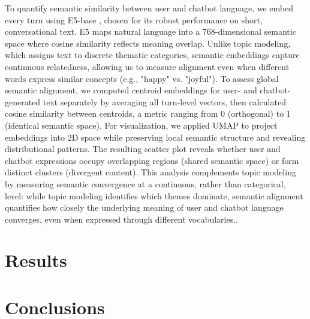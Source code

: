 \documentclass{article}
\begin{document}
To quantify semantic similarity between user and chatbot language, we embed every turn using E5-base \cite{Wang2022TextEB}, chosen for its robust performance on short, conversational text. E5 maps natural language into a 768-dimensional semantic space where cosine similarity reflects meaning overlap. Unlike topic modeling, which assigns text to discrete thematic categories, semantic embeddings capture continuous relatedness, allowing us to measure alignment even when different words express similar concepts (e.g., "happy" vs. "joyful"). To assess global semantic alignment, we computed centroid embeddings for user- and chatbot-generated text separately by averaging all turn-level vectors, then calculated cosine similarity between centroids, a metric ranging from 0 (orthogonal) to 1 (identical semantic space). For visualization, we applied UMAP to project embeddings into 2D space while preserving local semantic structure and revealing distributional patterns. The resulting scatter plot reveals whether user and chatbot expressions occupy overlapping regions (shared semantic space) or form distinct clusters (divergent content). This analysis complements topic modeling by measuring semantic convergence at a continuous, rather than categorical, level: while topic modeling identifies which themes dominate, semantic alignment quantifies how closely the underlying meaning of user and chatbot language converges, even when expressed through different vocabularies.\cite{socioaffective}. 


\section {Results}

\section {Conclusions}



\end{document}

